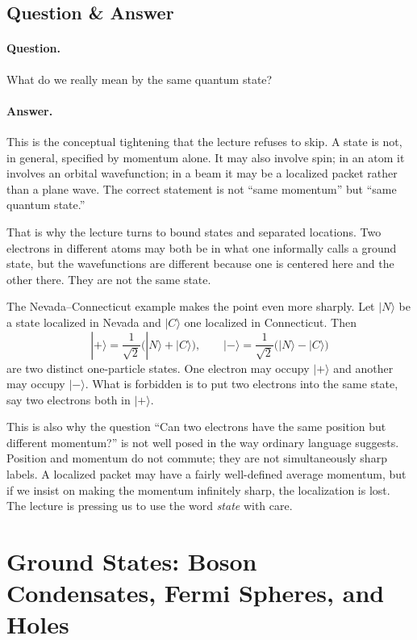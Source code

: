 \subsection{Question \& Answer}

\paragraph{Question.} What do we really mean by the same quantum state?

\paragraph{Answer.} This is the conceptual tightening that the lecture refuses to skip. A state is not, in general, specified by momentum alone. It may also involve spin; in an atom it involves an orbital wavefunction; in a beam it may be a localized packet rather than a plane wave. The correct statement is not ``same momentum'' but ``same quantum state.''

That is why the lecture turns to bound states and separated locations. Two electrons in different atoms may both be in what one informally calls a ground state, but the wavefunctions are different because one is centered here and the other there. They are not the same state.

The Nevada--Connecticut example makes the point even more sharply. Let \(|N\rangle\) be a state localized in Nevada and \(|C\rangle\) one localized in Connecticut. Then
\begin{equation}
|+\rangle=\frac{1}{\sqrt2}\bigl(|N\rangle+|C\rangle\bigr),
\qquad
|-\rangle=\frac{1}{\sqrt2}\bigl(|N\rangle-|C\rangle\bigr)
\end{equation}
are two distinct one-particle states. One electron may occupy \(|+\rangle\) and another may occupy \(|-\rangle\). What is forbidden is to put two electrons into the same state, say two electrons both in \(|+\rangle\).

This is also why the question ``Can two electrons have the same position but different momentum?'' is not well posed in the way ordinary language suggests. Position and momentum do not commute; they are not simultaneously sharp labels. A localized packet may have a fairly well-defined average momentum, but if we insist on making the momentum infinitely sharp, the localization is lost. The lecture is pressing us to use the word \emph{state} with care.

\section{Ground States: Boson Condensates, Fermi Spheres, and Holes}

